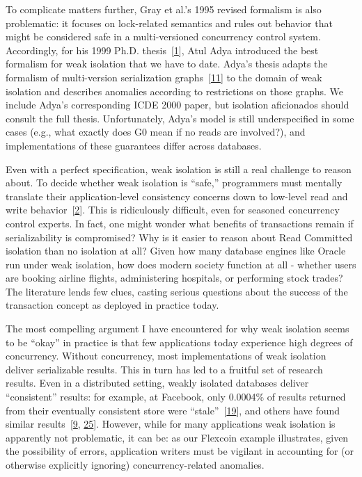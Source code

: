 \documentclass[b5paper,11pt,twoside,openright]{book}
\begin{document}
To complicate matters further, Gray et al.'s 1995 revised formalism is
also problematic: it focuses on lock-related semantics and rules out
behavior that might be considered safe in a multi-versioned concurrency
control system. Accordingly, for his 1999 Ph.D.
thesis~{{[}\protect\hyperlink{ref-adya-phd}{1}{]}}, Atul Adya introduced
the best formalism for weak isolation that we have to date. Adya's
thesis adapts the formalism of multi-version serialization
graphs~{{[}\protect\hyperlink{ref-bernstein-book}{11}{]}} to the domain
of weak isolation and describes anomalies according to restrictions on
those graphs. We include Adya's corresponding ICDE 2000 paper, but
isolation aficionados should consult the full thesis. Unfortunately,
Adya's model is still underspecified in some cases (e.g., what exactly
does G0 mean if no reads are involved?), and implementations of these
guarantees differ across databases.

Even with a perfect specification, weak isolation is still a real
challenge to reason about. To decide whether weak isolation is ``safe,''
programmers must mentally translate their application-level consistency
concerns down to low-level read and write
behavior~{{[}\protect\hyperlink{ref-consistency-borders}{2}{]}}. This is
ridiculously difficult, even for seasoned concurrency control experts.
In fact, one might wonder what benefits of transactions remain if
serializability is compromised? Why is it easier to reason about Read
Committed isolation than no isolation at all? Given how many database
engines like Oracle run under weak isolation, how does modern society
function at all - whether users are booking airline flights,
administering hospitals, or performing stock trades? The literature
lends few clues, casting serious questions about the success of the
transaction concept as deployed in practice today.

The most compelling argument I have encountered for why weak isolation
seems to be ``okay'' in practice is that few applications today
experience high degrees of concurrency. Without concurrency, most
implementations of weak isolation deliver serializable results. This in
turn has led to a fruitful set of research results. Even in a
distributed setting, weakly isolated databases deliver ``consistent''
results: for example, at Facebook, only 0.0004\% of results returned
from their eventually consistent store were
``stale''~{{[}\protect\hyperlink{ref-fb-inconsistency}{19}{]}}, and
others have found similar results~{{[}\protect\hyperlink{ref-pbs}{9},
  \protect\hyperlink{ref-wada}{25}{]}}. However, while for many
applications weak isolation is apparently not problematic, it can be: as
our Flexcoin example illustrates, given the possibility of errors,
application writers must be vigilant in accounting for (or otherwise
explicitly ignoring) concurrency-related anomalies.
\end{document}
